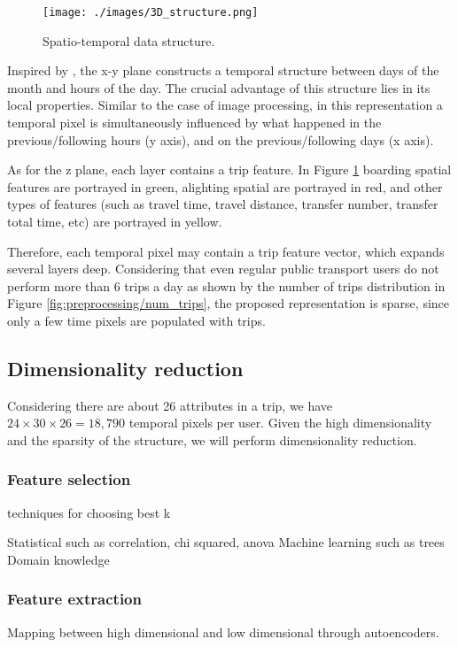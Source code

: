 \documentclass{article}
\begin{document}
\begin{figure}[H]
  \centering
  \texttt{[image: ./images/3D\_structure.png]}
  \caption{Spatio-temporal data structure.}
  \label{fig:data_mining/3D_structure}
\end{figure}

Inspired by \cite{langlois2016inferring}, the x-y plane constructs a temporal structure between days of the month and hours of the day. The crucial advantage of this structure lies in its local properties. Similar to the case of image processing, in this representation a temporal pixel is simultaneously influenced by what happened in the previous/following hours (y axis), and on the previous/following days (x axis).

As for the z plane, each layer contains a trip feature. In Figure \ref{fig:data_mining/3D_structure} boarding spatial features are portrayed in green, alighting spatial are portrayed in red, and other types of features (such as travel time, travel distance, transfer number, transfer total time, etc) are portrayed in yellow. 

Therefore, each temporal pixel may contain a trip feature vector, which expands several layers deep. Considering that even regular public transport users do not perform more than 6 trips a day as shown by the number of trips distribution in Figure \ref{fig:preprocessing/num_trips}, the proposed representation is sparse, since only a few time pixels are populated with trips.  


\subsection{Dimensionality reduction}
Considering there are about 26 attributes in a trip, we have $24 \times 30 \times 26 = 18,790$ temporal pixels per user. Given the high dimensionality and the sparsity of the structure, we will perform dimensionality reduction. 

\subsubsection{Feature selection}
techniques for choosing best k

Statistical such as correlation, chi squared, anova
Machine learning such as trees
Domain knowledge

\subsubsection{Feature extraction}
Mapping between high dimensional and low dimensional through autoencoders. 
\end{document}
